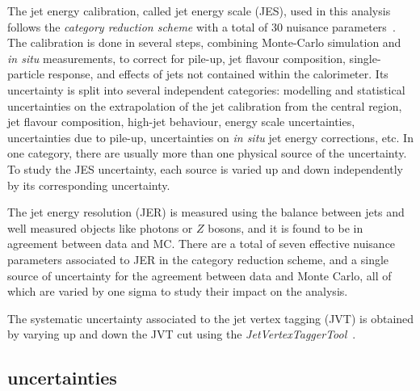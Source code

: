The jet energy calibration, called jet energy scale (JES), used in this analysis follows the \emph{category reduction scheme} with a total of 30 nuisance parameters~\cite{PERF-2016-04, PERF-2012-01}. The calibration is done in several steps, combining Monte-Carlo simulation and \textit{in situ} measurements, to correct for pile-up, jet flavour composition, single-particle response, and effects of jets not contained within the calorimeter. Its uncertainty is split into several independent categories: modelling and statistical uncertainties on the extrapolation of the jet calibration from the central region, jet flavour composition, high-\pT jet behaviour, \bjet energy scale uncertainties, uncertainties due to pile-up, uncertainties on \textit{in situ} jet energy corrections, etc. In one category, there are usually more than one physical source of the uncertainty. To study the JES uncertainty, each source is varied up and down independently by its corresponding uncertainty. 

The jet energy resolution (JER) is measured using the balance between jets and well measured objects like photons or $Z$ bosons, and it is found to be in agreement between data and MC. There are a total of seven effective nuisance parameters associated to JER in the category reduction scheme, and a single source of uncertainty for the agreement between data and Monte Carlo, all of which are varied by one sigma to study their impact on the analysis.

The systematic uncertainty associated to the jet vertex tagging (JVT) is obtained by varying up and down the JVT cut using the \emph{JetVertexTaggerTool}~\cite{ATLAS-CONF-2014-018}. 


\subsection*{\btag uncertainties}

